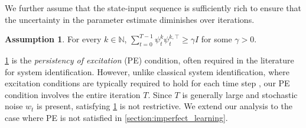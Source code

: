 \documentclass[journal,twoside,web,final]{ieeecolor}
\theoremstyle{definition}
\newtheorem{assumption}{Assumption}
\newcommand{\N}{\mathbb{N}}
\newcommand{\rz}[1]{#1}
\begin{document}
We further assume that the state-input sequence is sufficiently rich to ensure that the uncertainty in the parameter estimate diminishes over iterations. 
\begin{assumption}\label{ass:pe}
For every $k\in\N$, $\sum_{t=0}^{T-1} \psi^k_t \psi^{k,\top}_t \geq \gamma I$ for some $\gamma>0$.
\end{assumption}
\cref{ass:pe} is the \emph{persistency of excitation} (PE) condition, often required in the literature for system identification. However, unlike classical system identification, where excitation conditions are typically required to hold for each time step \cite{johnstone1982exponential}, our PE condition involves the entire iteration $T$. Since $T$ is generally large and stochastic noise $w_t$ is present, satisfying \cref{ass:pe} is not restrictive. 
\rz{We extend our analysis to the case where PE is not satisfied in \cref{section:imperfect_learning}.}
\end{document}
